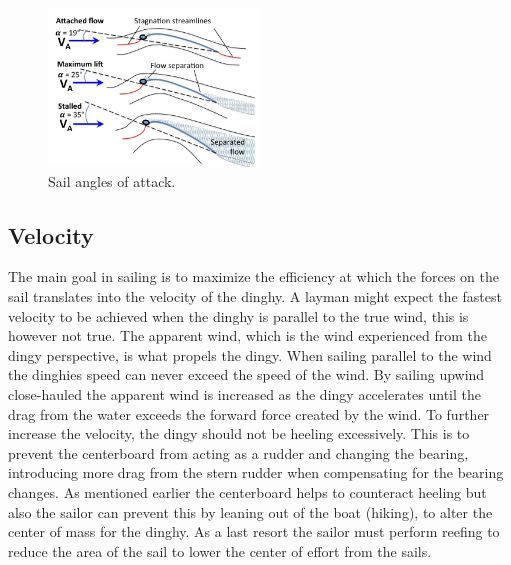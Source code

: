 \begin{figure}[H]
\centering
\includegraphics[width=0.5\textwidth]{Figures/max_lift.jpg}
\caption{Sail angles of attack.}
\label{max_liftl}
\end{figure}
\subsection{Velocity}
The main goal in sailing is to maximize the efficiency at which the forces on the sail translates into the velocity of the dinghy. A layman might expect the fastest velocity to be achieved when the dinghy is parallel to the true wind, this is however not true. The apparent wind, which is the wind experienced from the dingy perspective, is what propels the dingy. When sailing parallel to the wind the dinghies speed can never exceed the speed of the wind\cite{sail-force}. By sailing upwind close-hauled the apparent wind is increased as the dingy accelerates until the drag from the water exceeds the forward force created by the wind. To further increase the velocity, the dingy should not be heeling excessively. This is to prevent the centerboard from acting as a rudder and changing the bearing, introducing more drag from the stern rudder when compensating for the bearing changes. As mentioned earlier the centerboard helps to counteract heeling but also the sailor can prevent this by leaning out of the boat (hiking), to alter the center of mass for the dinghy. As a last resort the sailor must perform reefing to reduce the area of the sail to lower the center of effort from the sails.
